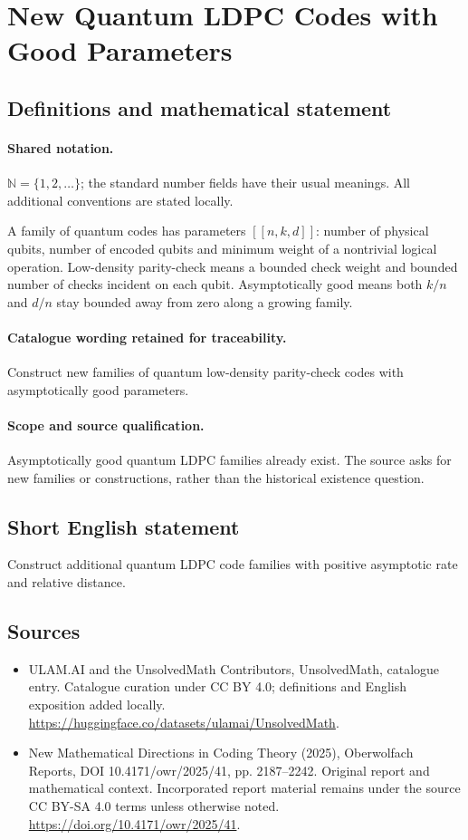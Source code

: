 \documentclass[11pt]{article}
\begin{document}
\section{New Quantum LDPC Codes with Good Parameters}\label{statement}

\subsection{Definitions and mathematical statement}

\paragraph{Shared notation.}$\mathbb N=\{1,2,\ldots\}$; the standard number fields have their usual meanings. All additional conventions are stated locally.


A family of quantum codes has parameters $[[n,k,d]]$: number of physical qubits, number of encoded qubits and minimum weight of a nontrivial logical operation. Low-density parity-check means a bounded check weight and bounded number of checks incident on each qubit. Asymptotically good means both $k/n$ and $d/n$ stay bounded away from zero along a growing family.

\paragraph{Catalogue wording retained for traceability.}
Construct new families of quantum low-density parity-check codes with asymptotically good parameters.

\paragraph{Scope and source qualification.}Asymptotically good quantum LDPC families already exist. The source asks for new families or constructions, rather than the historical existence question.
\subsection{Short English statement}
Construct additional quantum LDPC code families with positive asymptotic rate and relative distance.
\subsection{Sources}
\begin{itemize}
\item[\hypertarget{source:statement:1}{S1}] ULAM.AI and the UnsolvedMath Contributors, UnsolvedMath, catalogue entry. Catalogue curation under CC BY 4.0; definitions and English exposition added locally.
\url{https://huggingface.co/datasets/ulamai/UnsolvedMath}.
\item[\hypertarget{source:statement:2}{S2}] New Mathematical Directions in Coding Theory (2025), Oberwolfach Reports, DOI 10.4171/owr/2025/41, pp. 2187--2242. Original report and mathematical context. Incorporated report material remains under the source CC BY-SA 4.0 terms unless otherwise noted.
\url{https://doi.org/10.4171/owr/2025/41}.
\end{itemize}
\label{end:statement}
\end{document}
